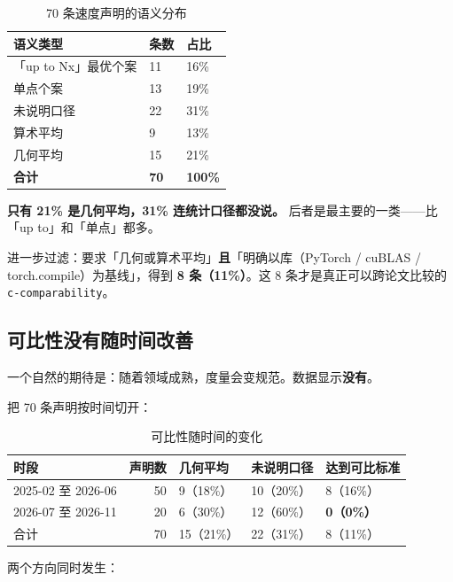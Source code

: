 \begin{table}[t]
\centering
\footnotesize
\setlength{\tabcolsep}{4pt}
\caption{70 条速度声明的语义分布}
\label{tab:5}
\begin{tabular}{lll}
\toprule
语义类型 & 条数 & 占比 \\
\midrule
「up to Nx」最优个案 & 11 & 16\% \\
单点个案 & 13 & 19\% \\
未说明口径 & 22 & 31\% \\
算术平均 & 9 & 13\% \\
几何平均 & 15 & 21\% \\
\textbf{合计} & \textbf{70} & \textbf{100\%} \\
\bottomrule
\end{tabular}
\end{table}



\textbf{只有 21\% 是几何平均，31\% 连统计口径都没说。} 后者是最主要的一类——比「up to」和「单点」都多。


进一步过滤：要求「几何或算术平均」\textbf{且}「明确以库（PyTorch / cuBLAS / torch.compile）为基线」，得到 \textbf{8 条（11\%）}。这 8 条才是真正可以跨论文比较的{\scriptsize\texttt{c-\hspace{0pt}comparability}}。


\subsection{可比性没有随时间改善}

一个自然的期待是：随着领域成熟，度量会变规范。数据显示\textbf{没有}。


把 70 条声明按时间切开：


\begin{table}[t]
\centering
\footnotesize
\setlength{\tabcolsep}{4pt}
\caption{可比性随时间的变化}
\label{tab:6}
\begin{tabular}{lrlll}
\toprule
时段 & 声明数 & 几何平均 & 未说明口径 & 达到可比标准 \\
\midrule
2025-02 至 2026-06 & 50 & 9（18\%） & 10（20\%） & 8（16\%） \\
2026-07 至 2026-11 & 20 & 6（30\%） & 12（60\%） & \textbf{0（0\%）} \\
合计 & 70 & 15（21\%） & 22（31\%） & 8（11\%） \\
\bottomrule
\end{tabular}
\end{table}


两个方向同时发生：


